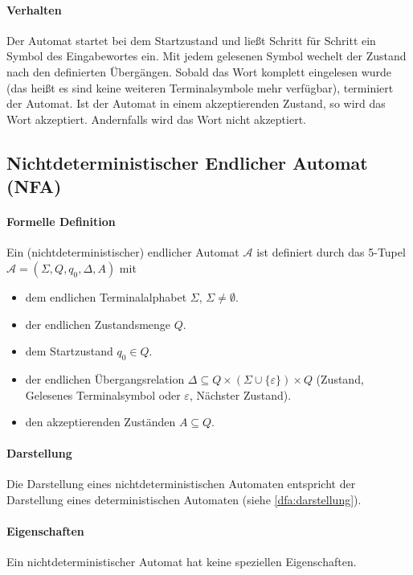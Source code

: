 \paragraph{Verhalten}
\label{dfa:verhalten}
Der Automat startet bei dem Startzustand und ließt Schritt für Schritt ein Symbol des Eingabewortes ein. Mit jedem gelesenen Symbol wechelt der Zustand nach den definierten Übergängen. Sobald das Wort komplett eingelesen wurde (das heißt es sind keine weiteren Terminalsymbole mehr verfügbar), terminiert der Automat. Ist der Automat in einem akzeptierenden Zustand, so wird das Wort akzeptiert. Andernfalls wird das Wort nicht akzeptiert.


\subsection{Nichtdeterministischer Endlicher Automat (NFA)}
\paragraph{Formelle Definition}
Ein (nichtdeterministischer) endlicher Automat $ \mathcal{A} $ ist definiert durch das 5-Tupel $ \mathcal{A} = (\Sigma, Q, q _ 0, \Delta, A) $ mit
\begin{itemize}
	\item dem endlichen Terminalalphabet $ \Sigma $, $ \Sigma \neq \emptyset $.
	\item der endlichen Zustandsmenge $ Q $.
	\item dem Startzustand $ q _ 0 \in Q $.
	\item der endlichen Übergangsrelation $ \Delta \subseteq Q \times (\Sigma \cup \{ \varepsilon \}) \times Q $ (Zustand, Gelesenes Terminalsymbol oder $ \varepsilon $, Nächster Zustand).
	\item den akzeptierenden Zuständen $ A \subseteq Q $.
\end{itemize}

\paragraph{Darstellung}
Die Darstellung eines nichtdeterministischen Automaten entspricht der Darstellung eines deterministischen Automaten (siehe \ref{dfa:darstellung}).

\paragraph{Eigenschaften}
Ein nichtdeterministischer Automat hat keine speziellen Eigenschaften.


